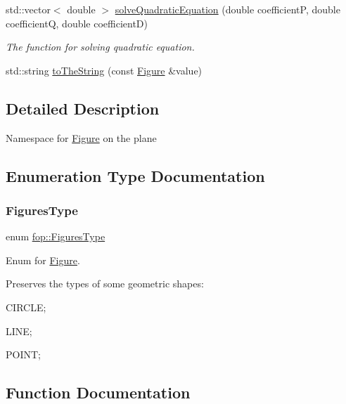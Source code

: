 \begin{DoxyCompactItemize}
std\+::vector$<$ double $>$ \mbox{\hyperlink{namespacefop_a28077bc23913a5e5f1522e7fbb13bcfe}{solve\+Quadratic\+Equation}} (double coefficientP, double coefficientQ, double coefficientD)
\begin{DoxyCompactList}\small\item\em The function for solving quadratic equation. \end{DoxyCompactList}\item 
std\+::string \mbox{\hyperlink{namespacefop_a6e88eff251cad9a76ad0c171c60ee230}{to\+The\+String}} (const \mbox{\hyperlink{classfop_1_1_figure}{Figure}} \&value)
\end{DoxyCompactItemize}


\subsection{Detailed Description}
Namespace for \mbox{\hyperlink{classfop_1_1_figure}{Figure}} on the plane 

\subsection{Enumeration Type Documentation}
\mbox{\label{namespacefop_a60dafe2e1ac5bb402dad57ecacde23d5}} 
\subsubsection{\texorpdfstring{Figures\+Type}{FiguresType}}
{\footnotesize\ttfamily enum \mbox{\hyperlink{namespacefop_a60dafe2e1ac5bb402dad57ecacde23d5}{fop\+::\+Figures\+Type}}\hspace{0.3cm}{\ttfamily [strong]}}



Enum for \mbox{\hyperlink{classfop_1_1_figure}{Figure}}. 

Preserves the types of some geometric shapes\+:
\begin{DoxyItemize}
\item C\+I\+R\+C\+LE;
\item L\+I\+NE;
\item P\+O\+I\+NT; 
\end{DoxyItemize}

\subsection{Function Documentation}
\mbox{\label{namespacefop_a386a3d90ae69e900125c0a3ad5c48cdf}} 
